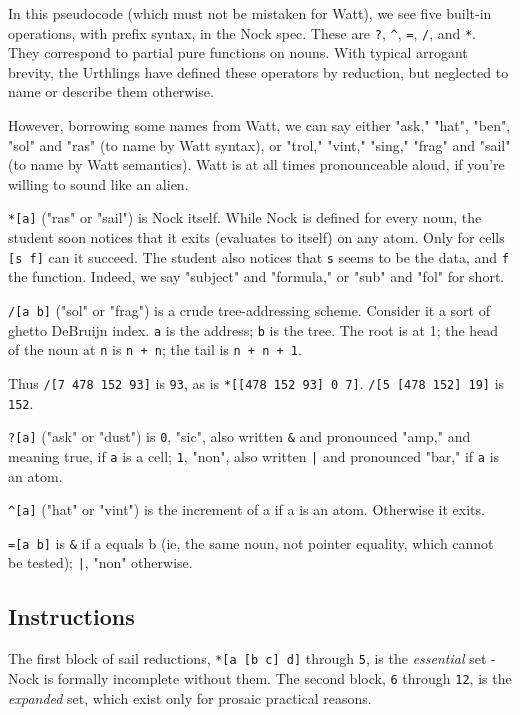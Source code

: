 \documentclass[10pt, nocopyrightspace]{sigplanconf}
\begin{document}
In this pseudocode (which must not be mistaken for Watt), we see five built-in operations, with prefix syntax, in the
Nock spec.  These are \verb|?|, \verb|^|, \verb|=|, \verb|/|,
and \verb|*|.  They correspond to
partial pure functions on nouns.  With typical arrogant brevity,
the Urthlings have defined these operators by reduction, but
neglected to name or describe them otherwise.

However, borrowing some names from Watt, we can say either
"ask," "hat", "ben", "sol" and "ras" (to name by Watt syntax),
or "trol," "vint," "sing," "frag" and "sail" (to name by Watt
semantics).  Watt is at all times pronounceable aloud, if you're
willing to sound like an alien.

\verb|*[a]| ("ras" or "sail") is Nock itself.  While Nock is defined
for every noun, the student soon notices that it exits
(evaluates to itself) on any atom.  Only for cells \verb|[s f]|
can it succeed.  The student also notices that \verb|s| seems to be the
data, and \verb|f| the function.  Indeed, we say "subject" and
"formula," or "sub" and "fol" for short.

\verb|/[a b]| ("sol" or "frag") is a crude tree-addressing
scheme.  Consider it a sort of ghetto DeBruijn index.
\verb|a| is the address; \verb|b| is the tree.  The root is at 1;
the head of the noun at \verb|n| is \verb|n + n|; the tail is
\verb|n + n + 1|.  

Thus \verb|/[7 478 152 93]| is \verb|93|, as is \verb|*[[478 152 93] 0 7]|.
\verb|/[5 [478 152] 19]| is \verb|152|.

\verb|?[a]| ("ask" or "dust") is \verb|0|, "sic", also written \verb|&| and
pronounced "amp," and meaning true, if \verb|a| is a cell;
\verb|1|, "non",
also written \verb!|! and pronounced "bar," if \verb|a| is an atom.

\verb|^[a]| ("hat" or "vint") is the increment of a if a is an atom.
Otherwise it exits.

\verb|=[a b]| is \verb|&| if a equals b (ie, the same noun, not pointer
equality, which cannot be tested); \verb!|!, "non" otherwise.

\subsection{Instructions}

The first block of sail reductions, \verb|*[a [b c] d]| through
\verb|5|, is
the \emph{essential} set - Nock is formally incomplete without them.
The second block, \verb|6| through \verb|12|, is the \emph{expanded} set, which
exist only for prosaic practical reasons.
\end{document}
